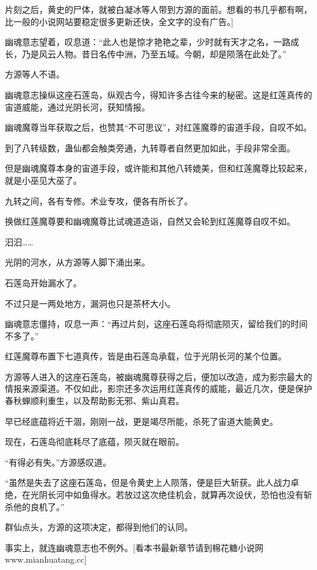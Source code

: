 
\begin{this_body}

片刻之后，黄史的尸体，就被白凝冰等人带到方源的面前。想看的书几乎都有啊，比一般的小说网站要稳定很多更新还快，全文字的没有广告。]

幽魂意志望着，叹息道：“此人也是惊才艳艳之辈，少时就有天才之名，一路成长，乃是风云人物。昔日名传中洲，乃至五域。今朝，却是陨落在此处了。”

方源等人不语。

幽魂意志操纵这座石莲岛，纵观古今，得知许多古往今来的秘密。这是红莲真传的宙道威能，通过光阴长河，获知情报。

幽魂魔尊当年获取之后，也赞其“不可思议”，对红莲魔尊的宙道手段，自叹不如。

到了八转级数，蛊仙都会触类旁通，九转尊者自然更加如此，手段非常全面。

但是幽魂魔尊本身的宙道手段，或许能和其他八转媲美，但和红莲魔尊比较起来，就是小巫见大巫了。

九转之间，各有专修。术业专攻，便各有所长了。

换做红莲魔尊要和幽魂魔尊比试魂道造诣，自然又会轮到红莲魔尊自叹不如。

汩汩……

光阴的河水，从方源等人脚下涌出来。

石莲岛开始漏水了。

不过只是一两处地方，漏洞也只是茶杯大小。

幽魂意志僵持，叹息一声：“再过片刻，这座石莲岛将彻底陨灭，留给我们的时间不多了。”

红莲魔尊布置下七道真传，皆是由石莲岛承载，位于光阴长河的某个位置。

方源等人进入的这座石莲岛，被幽魂魔尊获得之后，便加以改造，成为影宗最大的情报来源渠道。不仅如此，影宗还多次运用红莲真传的威能，最近几次，便是保护春秋蝉顺利重生，以及帮助影无邪、紫山真君。

早已经底蕴将近干涸，刚刚一战，更是竭尽所能，杀死了宙道大能黄史。

现在，石莲岛彻底耗尽了底蕴，陨灭就在眼前。

“有得必有失。”方源感叹道。

“虽然是失去了这座石莲岛，但是令黄史上人陨落，便是巨大斩获。此人战力卓绝，在光阴长河中如鱼得水。若放过这次绝佳机会，就算再次设伏，恐怕也没有斩杀他的良机了。”

群仙点头，方源的这项决定，都得到他们的认同。

事实上，就连幽魂意志也不例外。[看本书最新章节请到棉花糖小说网www.mianhuatang.cc]


\end{this_body}
